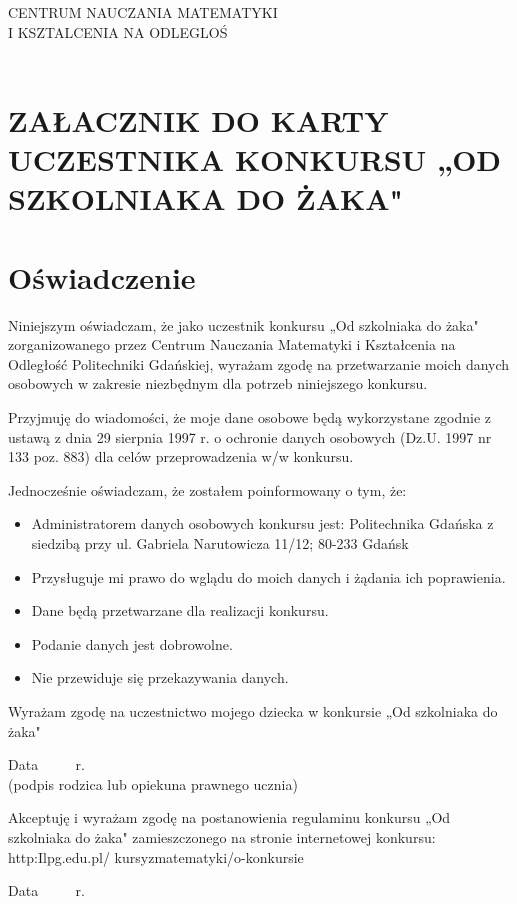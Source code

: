 \documentclass[10pt]{article}
\begin{document}
CENTRUM NAUCZANIA MATEMATYKI\\
I KSZTALCENIA NA ODLEGLOŚ\\
\(\qquad\)

\section*{ZAŁACZNIK DO KARTY UCZESTNIKA KONKURSU „OD SZKOLNIAKA DO ŻAKA"}
\section*{Oświadczenie}
Niniejszym oświadczam, że jako uczestnik konkursu „Od szkolniaka do żaka" zorganizowanego przez Centrum Nauczania Matematyki i Kształcenia na Odległość Politechniki Gdańskiej, wyrażam zgodę na przetwarzanie moich danych osobowych w zakresie niezbędnym dla potrzeb niniejszego konkursu.

Przyjmuję do wiadomości, że moje dane osobowe będą wykorzystane zgodnie z ustawą z dnia 29 sierpnia 1997 r. o ochronie danych osobowych (Dz.U. 1997 nr 133 poz. 883) dla celów przeprowadzenia w/w konkursu.

Jednocześnie oświadczam, że zostałem poinformowany o tym, że:

\begin{itemize}
  \item Administratorem danych osobowych konkursu jest: Politechnika Gdańska z siedzibą przy ul. Gabriela Narutowicza 11/12; 80-233 Gdańsk
  \item Przysługuje mi prawo do wglądu do moich danych i żądania ich poprawienia.
  \item Dane będą przetwarzane dla realizacji konkursu.
  \item Podanie danych jest dobrowolne.
  \item Nie przewiduje się przekazywania danych.
\end{itemize}

Wyrażam zgodę na uczestnictwo mojego dziecka w konkursie „Od szkolniaka do żaka"

Data \(\qquad\) r.\\
(podpis rodzica lub opiekuna prawnego ucznia)

Akceptuję i wyrażam zgodę na postanowienia regulaminu konkursu „Od szkolniaka do żaka" zamieszczonego na stronie internetowej konkursu: http:Ilpg.edu.pl/ kursyzmatematyki/o-konkursie

Data \(\qquad\) r.
\end{document}
